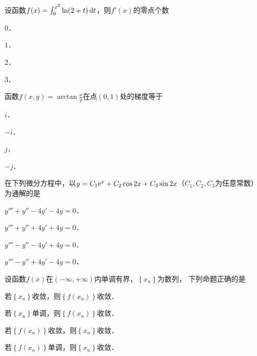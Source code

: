 \documentclass[plain,noanswer,medmath]{../../template/jnuexam}
\begin{document}




\begin{problem}
设函数$f(x) = \int_0^{x^2} \ln(2 + t)\mathop{}\!\mathrm{d} t$，则$f'(x)$的零点个数\pickout{}
\begin{abcd}
\item $0$．
\item $1$．
\item $2$．
\item $3$．
\end{abcd}
\end{problem}


\begin{problem}
函数$f(x,y) = \arctan \frac{x}{y}$在点$(0,1)$处的梯度等于\pickout{}
\begin{abcd}
\item $i$．
\item $- i$．
\item $j$．
\item $- j$．
\end{abcd}
\end{problem}


\begin{problem}
在下列微分方程中，以$y = C_1\mathrm{e}^x + C_2\cos 2x + C_3\sin 2x$（$C_1,C_2,C_3$为任意常数）为通解的是\pickout{}
\begin{abcd}
\item $y''' + y'' - 4y' - 4y = 0$．
\item $y''' + y'' + 4y' + 4y = 0$．
\item $y''' - y'' - 4y' + 4y = 0$．
\item $y''' - y'' + 4y' - 4y = 0$．
\end{abcd}
\end{problem}


\begin{problem}
设函数$f(x)$在$(-\infty , +\infty)$内单调有界，$\left\{x_n \right\}$为数列，
下列命题正确的是\pickout{}
\begin{abcd}
\item 若$\left\{x_n \right\}$收敛，则$\left\{f(x_n) \right\}$收敛．
\item 若$\left\{x_n \right\}$单调，则$\left\{f(x_n) \right\}$收敛．
\item 若$\left\{f(x_n) \right\}$收敛，则$\left\{x_n \right\}$收敛．
\item 若$\left\{f(x_n) \right\}$单调，则$\left\{x_n \right\}$收敛．
\end{abcd}
\end{problem}
\end{document}
